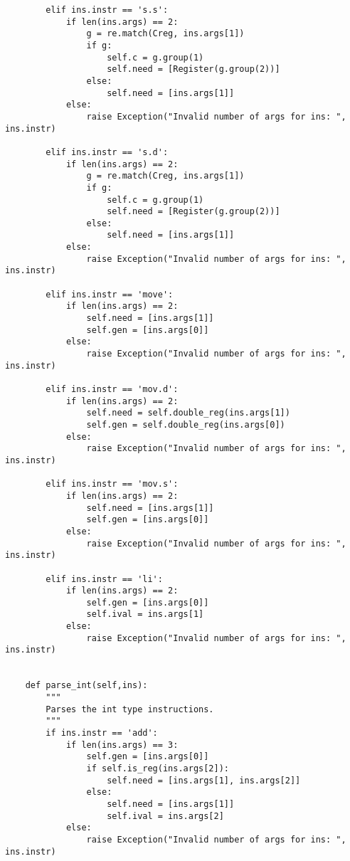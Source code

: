 \begin{lstlisting}
        elif ins.instr == 's.s':  
            if len(ins.args) == 2:
                g = re.match(Creg, ins.args[1])
                if g:
                    self.c = g.group(1)
                    self.need = [Register(g.group(2))]
                else:
                    self.need = [ins.args[1]]
            else:
                raise Exception("Invalid number of args for ins: ", ins.instr) 
                                         
        elif ins.instr == 's.d':  
            if len(ins.args) == 2:
                g = re.match(Creg, ins.args[1])
                if g:
                    self.c = g.group(1)
                    self.need = [Register(g.group(2))]
                else:
                    self.need = [ins.args[1]] 
            else:
                raise Exception("Invalid number of args for ins: ", ins.instr)   
                                      
        elif ins.instr == 'move':
            if len(ins.args) == 2:
                self.need = [ins.args[1]]
                self.gen = [ins.args[0]]
            else:
                raise Exception("Invalid number of args for ins: ", ins.instr)  
                         
        elif ins.instr == 'mov.d':
            if len(ins.args) == 2:
                self.need = self.double_reg(ins.args[1])
                self.gen = self.double_reg(ins.args[0])
            else:
                raise Exception("Invalid number of args for ins: ", ins.instr)  
                         
        elif ins.instr == 'mov.s':
            if len(ins.args) == 2:
                self.need = [ins.args[1]]
                self.gen = [ins.args[0]]
            else:
                raise Exception("Invalid number of args for ins: ", ins.instr)  
                         
        elif ins.instr == 'li':
            if len(ins.args) == 2:
                self.gen = [ins.args[0]]
                self.ival = ins.args[1]
            else:
                raise Exception("Invalid number of args for ins: ", ins.instr)           
            

    def parse_int(self,ins):
        """
        Parses the int type instructions.
        """
        if ins.instr == 'add':  
            if len(ins.args) == 3:
                self.gen = [ins.args[0]]
                if self.is_reg(ins.args[2]):
                    self.need = [ins.args[1], ins.args[2]]
                else: 
                    self.need = [ins.args[1]]
                    self.ival = ins.args[2]
            else:
                raise Exception("Invalid number of args for ins: ", ins.instr)   
                         

\end{lstlisting}
